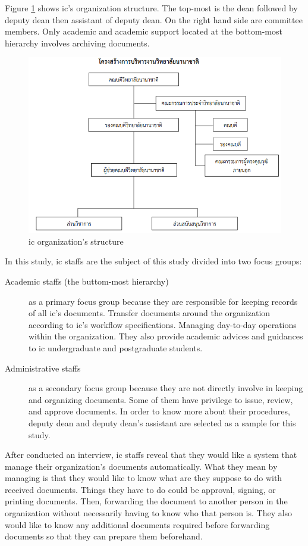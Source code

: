 Figure \ref{ic-org-sturcture} shows \gls{ic}'s organization structure.
The top-most is the dean followed by deputy dean then assistant of deputy dean.
On the right hand side are committee members.
Only academic and academic support located at the bottom-most hierarchy involves archiving documents.
 \begin{figure}[h]
 	\centering
 	\caption{\gls{ic} organization's structure}
 	\label{ic-org-sturcture}
 	\includegraphics[scale=0.7]{res/Methodology/ic-org}
 \end{figure}

In this study, \gls{ic} staffs are the subject of this study divided into two focus groups:
\begin{description}
	\item [Academic staffs (the buttom-most hierarchy)] as a primary focus group because they are responsible for keeping records of all \gls{ic}'s documents.
	Transfer documents around the organization according to \gls{ic}'s workflow specifications.
	Managing day-to-day operations within the organization.
	They also provide academic advices and guidances to \gls{ic} undergraduate and postgraduate students.

	\item [Administrative staffs] as a secondary focus group because they are not directly involve in keeping and organizing documents.
	Some of them have privilege to issue, review, and approve documents.
	In order to know more about their procedures, deputy dean and deputy dean's assistant are selected as a sample for this study.
\end{description}

After conducted an interview, \gls{ic} staffs reveal that they would like a system that manage their organization's documents automatically.
What they mean by managing is that they would like to know what are they suppose to do with received documents.
Things they have to do could be approval, signing, or printing documents.
Then, forwarding the document to another person in the organization without necessarily having to know who that person is.
They also would like to know any additional documents required before forwarding documents so that they can prepare them beforehand.

